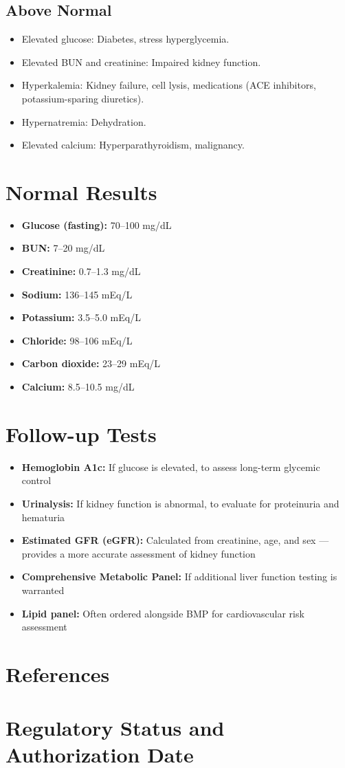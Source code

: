 \subsection*{Above Normal}
\begin{itemize}
  \item Elevated glucose: Diabetes, stress hyperglycemia.
  \item Elevated BUN and creatinine: Impaired kidney function.
  \item Hyperkalemia: Kidney failure, cell lysis, medications (ACE inhibitors, potassium-sparing diuretics).
  \item Hypernatremia: Dehydration.
  \item Elevated calcium: Hyperparathyroidism, malignancy.
\end{itemize}

\section*{Normal Results}
\begin{itemize}
  \item \textbf{Glucose (fasting):} 70--100 mg/dL
  \item \textbf{BUN:} 7--20 mg/dL
  \item \textbf{Creatinine:} 0.7--1.3 mg/dL
  \item \textbf{Sodium:} 136--145 mEq/L
  \item \textbf{Potassium:} 3.5--5.0 mEq/L
  \item \textbf{Chloride:} 98--106 mEq/L
  \item \textbf{Carbon dioxide:} 23--29 mEq/L
  \item \textbf{Calcium:} 8.5--10.5 mg/dL
\end{itemize}

\section*{Follow-up Tests}
\begin{itemize}
  \item \textbf{Hemoglobin A1c:} If glucose is elevated, to assess long-term glycemic control
  \item \textbf{Urinalysis:} If kidney function is abnormal, to evaluate for proteinuria and hematuria
  \item \textbf{Estimated GFR (eGFR):} Calculated from creatinine, age, and sex --- provides a more accurate assessment of kidney function \cite{levey2009new}
  \item \textbf{Comprehensive Metabolic Panel:} If additional liver function testing is warranted
  \item \textbf{Lipid panel:} Often ordered alongside BMP for cardiovascular risk assessment
\end{itemize}


\section*{References}



\clearpage
\section*{Regulatory Status and Authorization Date}

\clearpage
